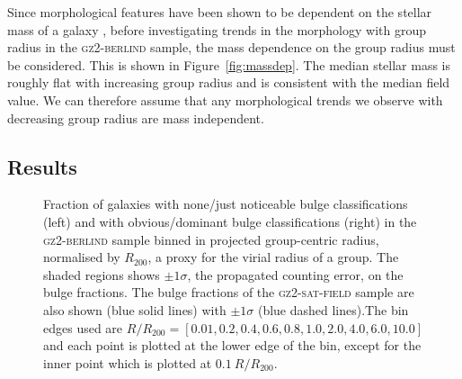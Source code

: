 \documentclass[useAMS,usenatbib]{mn2e}
\begin{document}
Since morphological features have been shown to be dependent on the stellar mass of a galaxy \citep[e.g. the increase in the bar fraction with stellar mass; see][]{nair10, skibba12}, before investigating trends in the morphology with group radius in the \textsc{gz2-berlind} sample, the mass dependence on the group radius must be considered. This is shown in Figure~\ref{fig:massdep}. The median stellar mass is roughly flat with increasing group radius and is consistent with the median field value. We can therefore assume that any morphological trends we observe with decreasing group radius are mass independent.

\subsection{Results}

\begin{figure}
\caption[Bulge fraction with group radius in the \textsc{gz2-berlind} sample]{Fraction of galaxies with none/just noticeable bulge classifications (left) and with obvious/dominant bulge classifications (right) in the \textsc{gz2-berlind} sample binned in projected group-centric radius, normalised by $R_{200}$, a proxy for the virial radius of a group. The shaded regions shows $\pm1\sigma$, the propagated counting error, on the bulge fractions. The bulge fractions of the \textsc{gz2-sat-field} sample are also shown (blue solid lines) with $\pm1\sigma$ (blue dashed lines).The bin edges used are $R/R_{200} =  [0.01 ,   0.2,   0.4,   0.6,   0.8,   1.0 ,   2.0 ,   4.0 ,   6.0 ,  10.0]$ and each point is plotted at the lower edge of the bin, except for the inner point which is plotted at $0.1~R/R_{200}$.}
\label{fig:bulgeradius}
\end{figure}
\end{document}
